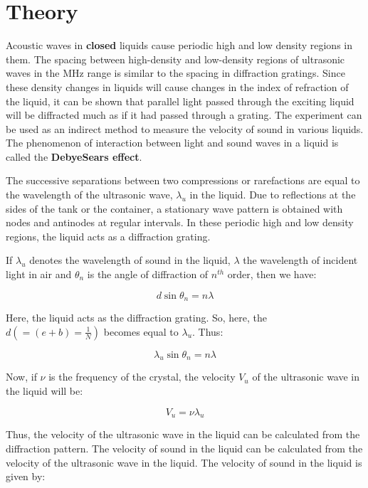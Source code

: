 \section{Theory}

	Acoustic waves in \textbf{closed} liquids cause periodic high and low density regions in them. The spacing between high-density and low-density regions of ultrasonic waves in the MHz range is similar to the spacing in diffraction gratings. Since these density changes in liquids will cause changes in the index of refraction of the liquid, it can be shown that parallel light passed through the exciting liquid will be diffracted much as if it had passed through a grating. The experiment can be used as an indirect method to measure the velocity of sound in various liquids. The phenomenon of interaction between light and sound waves in a liquid is called the \textbf{DebyeSears effect}.

	The successive separations between two compressions or rarefactions are equal to the wavelength of the ultrasonic wave, $\lambda_u$ in the liquid. Due to reflections at the sides of the tank or the container, a stationary wave pattern is obtained with nodes and antinodes at regular intervals. In these periodic high and low density regions, the liquid acts as a diffraction grating.

	If $\lambda_u$ denotes the wavelength of sound in the liquid, $\lambda$ the wavelength of incident light in air and $\theta_n$ is the angle of diffraction of $n^{th}$ order, then we have:

	\vspace{-4mm}
	$$d\sin\theta_n = n\lambda$$

	Here, the liquid acts as the diffraction grating. So, here, the $d (= (e+b) = \frac{1}{N})$ becomes equal to $\lambda_u$. Thus:

	\vspace{-4mm}
	$$\lambda_u\sin\theta_n = n\lambda$$

	Now, if $\nu$ is the frequency of the crystal, the velocity $V_u$ of the ultrasonic wave in the liquid will be:

	\vspace{-4mm}
	$$V_u = \nu\lambda_u$$

	Thus, the velocity of the ultrasonic wave in the liquid can be calculated from the diffraction pattern. The velocity of sound in the liquid can be calculated from the velocity of the ultrasonic wave in the liquid. The velocity of sound in the liquid is given by:

